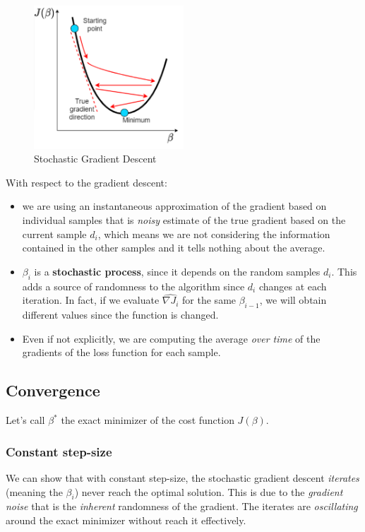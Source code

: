 \begin{figure}
    \centering
    \includegraphics[width=0.5\textwidth]{./figures/chapter_6/graphicsgd.png}
    \caption{Stochastic Gradient Descent}
    \label{fig:stochastic_gradient_descent}
\end{figure}

With respect to the gradient descent:
\begin{itemize}
    \item we are using an instantaneous approximation of the gradient based on individual samples that is \textit{noisy} estimate of the true gradient based on the current sample $d_i$, which means we are not considering the information contained in the other samples and it tells nothing about the average. 
    \item $\beta_i$ is a \textbf{stochastic process}, since it depends on the random samples $d_i$. This adds a source of randomness to the algorithm since $d_i$ changes at each iteration. In fact, if we evaluate $\hat{\nabla J_i}$ for the same $\beta_{i-1}$, we will obtain different values since the function is changed.
    \item Even if not explicitly, we are computing the average \textit{over time} of the gradients of the loss function for each sample.
\end{itemize}

\subsection{Convergence}
Let's call $\beta^\ast$ the exact minimizer of the cost function $J(\beta)$.
\subsubsection*{Constant step-size}
We can show that with constant step-size, the stochastic gradient descent \textit{iterates} (meaning the $\beta_i$) never reach the optimal solution. This is due to the \textit{gradient noise} that is the \textit{inherent} randomness of the gradient. The iterates are \textit{oscillating} around the exact minimizer without reach it effectively.

